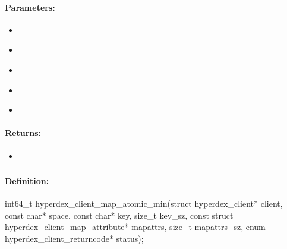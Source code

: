 \paragraph{Parameters:}
\begin{itemize}[noitemsep]
\item {}\\

\item {}\\

\item {}\\

\item {}\\

\item {}\\

\end{itemize}

\paragraph{Returns:}
\begin{itemize}[noitemsep]
\item {}\\

\end{itemize}

\pagebreak
\subsubsection{}
\label{api:c:map_atomic_min}


\paragraph{Definition:}
\begin{ccode}
int64_t hyperdex_client_map_atomic_min(struct hyperdex_client* client,
        const char* space,
        const char* key, size_t key_sz,
        const struct hyperdex_client_map_attribute* mapattrs, size_t mapattrs_sz,
        enum hyperdex_client_returncode* status);
\end{ccode}

